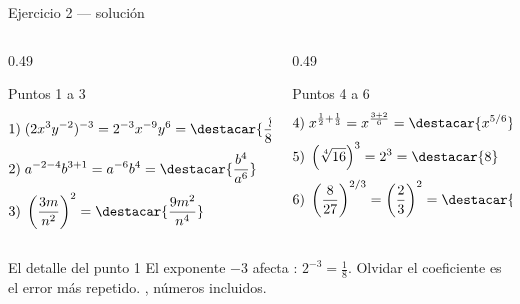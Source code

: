 \documentclass[aspectratio=169,10pt]{beamer}
\begin{document}
\begin{frame}{Ejercicio 2 — solución}
  \tiny
  \begin{columns}[T,onlytextwidth]
    \begin{column}{0.49\textwidth}
      \begin{block}{Puntos 1 a 3}
        \tiny
        \begin{align*}
          1)\;& (2x^{3}y^{-2})^{-3} = 2^{-3}x^{-9}y^{6}
                = \destacar{\frac{y^{6}}{8x^{9}}} \\[0.3em]
          2)\;& a^{-2-4}b^{3+1} = a^{-6}b^{4}
                = \destacar{\frac{b^{4}}{a^{6}}} \\[0.3em]
          3)\;& \left(\frac{3m}{n^{2}}\right)^{2}
                = \destacar{\frac{9m^{2}}{n^{4}}}
        \end{align*}
      \end{block}
    \end{column}
    \begin{column}{0.49\textwidth}
      \begin{block}{Puntos 4 a 6}
        \tiny
        \begin{align*}
          4)\;& x^{\frac{1}{2}+\frac{1}{3}} = x^{\frac{3+2}{6}}
                = \destacar{x^{5/6}} \\[0.3em]
          5)\;& \left(\sqrt[4]{16}\right)^{3} = 2^{3} = \destacar{8} \\[0.3em]
          6)\;& \left(\frac{8}{27}\right)^{2/3}
                = \left(\frac{2}{3}\right)^{2} = \destacar{\frac{4}{9}}
        \end{align*}
      \end{block}
    \end{column}
  \end{columns}

  \vspace{0.1cm}
  \begin{alertblock}{El detalle del punto 1}
    \tiny
    El exponente $-3$ afecta : $2^{-3} = \tfrac{1}{8}$.
    Olvidar el coeficiente es el error más repetido. , números incluidos.
  \end{alertblock}
\end{frame}
\end{document}
